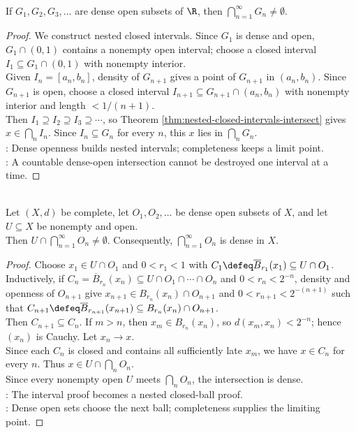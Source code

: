 \begin{theorem} \label{thm:dense-open-baire-real-line}\label{thm:completeness-and-baire-source-todo} \\
If $G_1,G_2,G_3,\ldots$ are dense open subsets of $\R$, then $\bigcap_{n=1}^{\infty}G_n\neq\emptyset$.
\begin{proof}
We construct nested closed intervals. Since $G_1$ is dense and open, $G_1\cap(0,1)$ contains a nonempty open interval; choose a closed interval $I_1\subseteq G_1\cap(0,1)$ with nonempty interior.\\
Given $I_n=[a_n,b_n]$, density of $G_{n+1}$ gives a point of $G_{n+1}$ in $(a_n,b_n)$. Since $G_{n+1}$ is open, choose a closed interval $I_{n+1}\subseteq G_{n+1}\cap(a_n,b_n)$ with nonempty interior and length $<1/(n+1)$.\\
Then $I_1\supseteq I_2\supseteq I_3\supseteq\cdots$, so Theorem \ref{thm:nested-closed-intervals-intersect} gives $x\in\bigcap_n I_n$. Since $I_n\subseteq G_n$ for every $n$, this $x$ lies in $\bigcap_nG_n$.\\
: Dense openness builds nested intervals; completeness keeps a limit point.\\
: A countable dense-open intersection cannot be destroyed one interval at a time.
\end{proof}
\end{theorem}

\begin{theorem} \label{thm:dense-open-baire-complete-metric-space} \\
Let $(X,d)$ be complete, let $O_1,O_2,\ldots$ be dense open subsets of $X$, and let $U\subseteq X$ be nonempty and open.\\
Then $U\cap\bigcap\limits_{n=1}^{\infty}O_n\neq\emptyset$. Consequently, $\bigcap\limits_{n=1}^{\infty}O_n$ is dense in $X$.
\begin{proof}
Choose $x_1\in U\cap O_1$ and $0<r_1<1$ with $C_1\defeq\overline{B}_{r_1}(x_1)\subseteq U\cap O_1$.\\
Inductively, if $C_n=\overline{B}_{r_n}(x_n)\subseteq U\cap O_1\cap\cdots\cap O_n$ and $0<r_n<2^{-n}$, density and openness of $O_{n+1}$ give $x_{n+1}\in B_{r_n}(x_n)\cap O_{n+1}$ and $0<r_{n+1}<2^{-(n+1)}$ such that $C_{n+1}\defeq\overline{B}_{r_{n+1}}(x_{n+1})\subseteq B_{r_n}(x_n)\cap O_{n+1}$.\\
Then $C_{n+1}\subseteq C_n$. If $m>n$, then $x_m\in B_{r_n}(x_n)$, so $d(x_m,x_n)<2^{-n}$; hence $(x_n)$ is Cauchy. Let $x_n\to x$.\\
Since each $C_n$ is closed and contains all sufficiently late $x_m$, we have $x\in C_n$ for every $n$. Thus $x\in U\cap\bigcap_nO_n$.\\
Since every nonempty open $U$ meets $\bigcap_nO_n$, the intersection is dense.\\
: The interval proof becomes a nested closed-ball proof.\\
: Dense open sets choose the next ball; completeness supplies the limiting point.
\end{proof}
\end{theorem}

